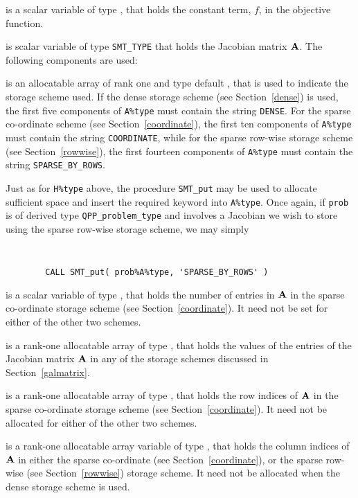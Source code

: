 \documentclass{galahad}
\newcommand{\packagename}{QPP}
\begin{document}
\begin{description}
 is a scalar variable of type 
\realdp, that holds 
the constant term, $f$, in the objective function.

 is scalar variable of type {\tt SMT\_TYPE} 
that holds the Jacobian matrix ${\mathbf{A}}$. The following components are used:

\begin{description}

 is an allocatable array of rank one and type default \character, 
that is used to indicate the storage scheme used. If the dense storage scheme 
(see Section~\ref{dense}) is used, 
the first five components of {\tt A\%type} must contain the
string {\tt DENSE}.
For the sparse co-ordinate scheme (see Section~\ref{coordinate}), 
the first ten components of {\tt A\%type} must contain the
string {\tt COORDINATE}, while 
for the sparse row-wise storage scheme (see Section~\ref{rowwise}),
the first fourteen components of {\tt A\%type} must contain the
string {\tt SPARSE\_BY\_ROWS}.

Just as for {\tt H\%type} above, the procedure {\tt SMT\_put} 
may be used to allocate sufficient space and insert the required keyword
into {\tt A\%type}.
Once again, if {\tt prob} is of derived type {\tt \packagename\_problem\_type}
and involves a Jacobian we wish to store using the sparse row-wise 
storage scheme, we may simply
{\tt 
\begin{verbatim}
        CALL SMT_put( prob%A%type, 'SPARSE_BY_ROWS' )
\end{verbatim}
}
\noindent

 is a scalar variable of type \integer, that 
holds the number of entries in ${\mathbf{A}}$
in the sparse co-ordinate storage scheme (see Section~\ref{coordinate}). 
It need not be set for either of the other two schemes.

 is a rank-one allocatable array of type \realdp, that holds
the values of the entries of the Jacobian matrix ${\mathbf{A}}$ in any of the 
storage schemes discussed in Section~\ref{galmatrix}.

 is a rank-one allocatable array of type \integer,
that holds the row indices of ${\mathbf{A}}$ in the sparse co-ordinate storage
scheme (see Section~\ref{coordinate}). 
It need not be allocated for either of the other two schemes.

 is a rank-one allocatable array variable of type \integer,
that holds the column indices of ${\mathbf{A}}$ in either the sparse co-ordinate 
(see Section~\ref{coordinate}), or the sparse row-wise 
(see Section~\ref{rowwise}) storage scheme.
It need not be allocated when the dense storage scheme is used.


\end{description}
\end{description}
\end{document}

